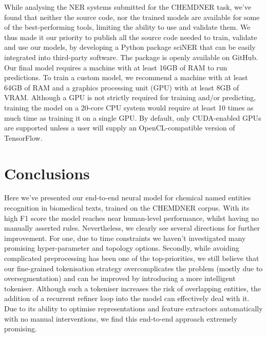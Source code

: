 \documentclass[twocolumn]{bmcart}%
\begin{document}
While analysing the NER systems submitted for the CHEMDNER task, we've found that neither the source code, nor the trained models are available for some of the best-performing tools, limiting the ability to use and validate them.
We thus made it our priority to publish all the source code needed to train, validate and use our models, by developing a Python package sciNER that can be easily integrated into third-party software.
The package is openly available on GitHub.
Our final model requires a machine with at least 16GB of RAM to run predictions. 
To train a custom model, we recommend a machine with at least 64GB of RAM and a graphics processing unit (GPU) with at least 8GB of VRAM. 
Although a GPU is not strictly required for training and/or predicting, training the model on a 20-core CPU system would require at least 10 times as much time as training it on a single GPU.
By default, only CUDA-enabled GPUs are supported unless a user will supply an OpenCL-compatible version of TensorFlow.

\section*{Conclusions}

Here we've presented our end-to-end neural model for chemical named entities recognition in biomedical texts, trained on the CHEMDNER corpus. 
With its high F1 score the model reaches near human-level performance, whilst having no manually asserted rules.
Nevertheless, we clearly see several directions for further improvement.
For one, due to time constraints we haven't investigated many promising hyper-parameter and topology options.
Secondly, while avoiding complicated preprocessing has been one of the top-priorities, we still believe that our fine-grained tokenisation strategy overcomplicates the problem (mostly due to oversegmentation) and can be improved by introducing a more intelligent tokeniser.
Although such a tokeniser increases the risk of overlapping entities, the addition of a recurrent refiner loop into the model can effectively deal with it.
Due to its ability to optimise representations and feature extractors automatically with no manual interventions, we find this end-to-end approach extremely promising.


\end{document}
